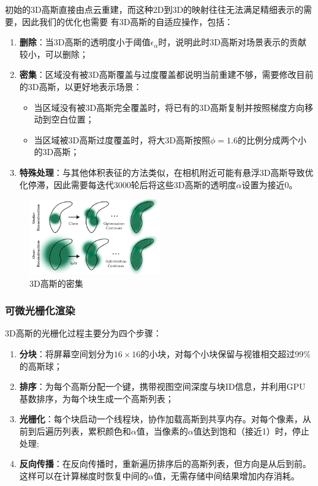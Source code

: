 初始的3D高斯直接由点云重建，而这种2D到3D的映射往往无法满足精细表示的需要，因此我们的优化也需要
有3D高斯的自适应操作，包括：
\begin{enumerate}
    \item \textbf{删除}：当3D高斯的透明度小于阈值$\epsilon_{\alpha}$时，说明此时3D高斯对场景表示的贡献较小，可以删除；
    \item \textbf{密集}：区域没有被3D高斯覆盖与过度覆盖都说明当前重建不够，需要修改目前的3D高斯，以更好地表示场景：
        \begin{itemize}
            \item 当区域没有被3D高斯完全覆盖时，将已有的3D高斯复制并按照梯度方向移动到空白位置；
            \item 当区域被3D高斯过度覆盖时，将大3D高斯按照$\phi=1.6$的比例分成两个小的3D高斯；
        \end{itemize}
    \item \textbf{特殊处理}：与其他体积表征的方法类似，在相机附近可能有悬浮3D高斯导致优化停滞，因此需要每迭代3000轮后将这些3D高斯的透明度$\alpha$设置为接近0。
\end{enumerate}

\begin{figure}[ht]
    \centering
    \includegraphics[width=0.5\textwidth]{source/img/gauss_recon.png}
    \caption{3D高斯的密集}
\end{figure}

\subsubsection{可微光栅化渲染}

3D高斯的光栅化过程主要分为四个步骤：
\begin{enumerate}
    \item \textbf{分块}：将屏幕空间划分为$16\times 16$的小块，对每个小块保留与视锥相交超过99\%的高斯球；
    \item \textbf{排序}：为每个高斯分配一个键，携带视图空间深度与块ID信息，并利用GPU基数排序，为每个块生成一个高斯列表；
    \item \textbf{光栅化}：每个块启动一个线程块，协作加载高斯到共享内存。对每个像素，从前到后遍历列表，累积颜色和$\alpha$值，当像素的$\alpha$值达到饱和（接近1）时，停止处理;
    \item \textbf{反向传播}：在反向传播时，重新遍历排序后的高斯列表，但方向是从后到前。这样可以在计算梯度时恢复中间的$\alpha$值，无需存储中间结果增加内存消耗。
\end{enumerate}

